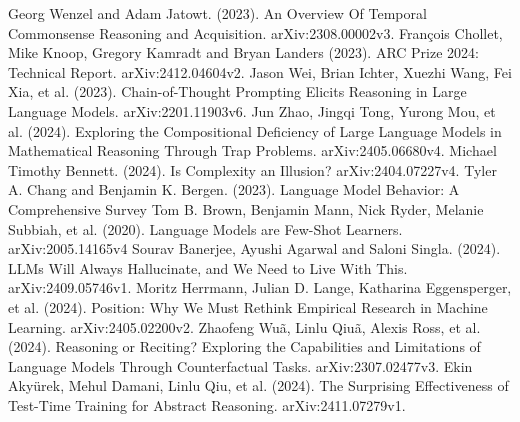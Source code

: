 \documentclass[11pt]{scrartcl}
\begin{document}
\begin{thebibliography}{14}
    Georg Wenzel and Adam Jatowt. (2023). An Overview Of Temporal Commonsense Reasoning and Acquisition. arXiv:2308.00002v3.
    François Chollet, Mike Knoop, Gregory Kamradt and Bryan Landers (2023). ARC Prize 2024: Technical Report. arXiv:2412.04604v2.
    Jason Wei, Brian Ichter, Xuezhi Wang, Fei Xia, et al. (2023). Chain-of-Thought Prompting Elicits Reasoning
in Large Language Models. arXiv:2201.11903v6.
    Jun Zhao, Jingqi Tong, Yurong Mou, et al. (2024). Exploring the Compositional Deficiency of Large Language Models in
Mathematical Reasoning Through Trap Problems. arXiv:2405.06680v4. 
    Michael Timothy Bennett. (2024). Is Complexity an Illusion? arXiv:2404.07227v4.
    Tyler A. Chang and Benjamin K. Bergen. (2023). Language Model Behavior: A Comprehensive Survey
    Tom B. Brown, Benjamin Mann, Nick Ryder, Melanie Subbiah, et al. (2020). Language Models are Few-Shot Learners. arXiv:2005.14165v4 
    Sourav Banerjee, Ayushi Agarwal and Saloni Singla. (2024). LLMs Will Always Hallucinate, and We Need to Live With This. arXiv:2409.05746v1.
    Moritz Herrmann, Julian D. Lange, Katharina Eggensperger, et al. (2024). Position: Why We Must Rethink Empirical Research in Machine Learning. arXiv:2405.02200v2.
    Zhaofeng Wuã, Linlu Qiuã, Alexis Ross, et al. (2024). Reasoning or Reciting? Exploring the Capabilities and Limitations of Language Models Through Counterfactual Tasks. arXiv:2307.02477v3.
    Ekin Akyürek, Mehul Damani, Linlu Qiu, et al. (2024). The Surprising Effectiveness of Test-Time Training for Abstract Reasoning. arXiv:2411.07279v1.
\end{thebibliography}
\end{document}
